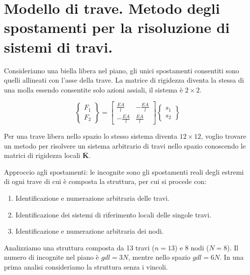 \section{Modello di trave. Metodo degli spostamenti per la risoluzione di sistemi di travi.}

Consideriamo una biella libera nel piano, gli unici spostamenti consentiti sono quelli allineati con l'asse della trave. La matrice di rigidezza diventa la stessa di una molla essendo consentite solo azioni assiali, il sistema è $2\times 2$.

\begin{equation*}
\left\{
\begin{array}{c}
F_{1}\\
F_{2} 
\end{array}
\right\}
=
\begin{bmatrix}
\frac{EA}{l} & -\frac{EA}{l}\\
-\frac{EA}{l} & \frac{EA}{l}
\end{bmatrix}
\left\{
\begin{array}{c}
s_{1} \\
s_{2}
\end{array}
\right\}
\end{equation*}

Per una trave libera nello spazio lo stesso sistema diventa $12\times12$, voglio trovare un metodo per risolvere un sistema arbitrario di travi nello spazio conoscendo le matrici di rigidezza locali $\boldsymbol{\bar{K}}$.


    Approccio agli spostamenti: le incognite sono gli spostamenti reali degli estremi di ogni trave di cui è composta la struttura, per cui si procede con:
    \begin{enumerate}
        \item Identificazione e numerazione arbitraria delle travi.\\
         \item Identificazione dei sistemi di riferimento locali delle singole travi.\\
          \item Identificazione e numerazione arbitraria dei nodi.\\
    \end{enumerate}


Analizziamo una struttura composta da 13 travi ($n=13$) e 8 nodi ($N=8$). Il numero di incognite nel piano è $gdl = 3N$, mentre nello spazio $gdl = 6N$. In una prima analisi consideriamo la struttura senza i vincoli.

